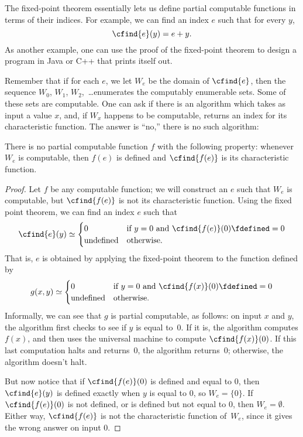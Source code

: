 \documentclass[../../../include/open-logic-section]{subfiles}
\begin{document}

The fixed-point theorem essentially lets us define partial computable
functions in terms of their indices. For example, we can find an
index $e$ such that for every $y$,
\[
\cfind{e}(y) = e + y.
\]
As another example, one can use the proof of the fixed-point theorem
to design a program in Java or C++ that prints itself out.

Remember that if for each $e$, we let $W_e$ be the domain of $\cfind{e}$,
then the sequence $W_0$, $W_1$, $W_2$,~\dots enumerates the computably
enumerable sets. Some of these sets are computable. One can ask if
there is an algorithm which takes as input a value $x$, and, if $W_x$
happens to be computable, returns an index for its characteristic
function. The answer is ``no,'' there is no such algorithm:

\begin{thm}
There is no partial computable function $f$ with the following
property: whenever $W_e$ is computable, then $f(e)$ is defined and
$\cfind{f(e)}$ is its characteristic function.
\end{thm}

\begin{proof}
Let $f$ be any computable function; we will construct an $e$
such that $W_e$ is computable, but $\cfind{f(e)}$ is not its
characteristic function. Using the fixed point theorem, we can find an
index $e$ such that
\[
\cfind{e}(y) \simeq
\begin{cases}
0 & \text{if $y=0$ and $\cfind{f(e)}(0) \fdefined = 0$} \\
\text{undefined} & \text{otherwise.}
\end{cases}
\]
That is, $e$ is obtained by applying the fixed-point theorem to the
function defined by
\[
g(x,y) \simeq
\begin{cases}
0 & \text{if $y=0$ and $\cfind{f(x)}(0) \fdefined = 0$} \\
\text{undefined} & \text{otherwise.}
\end{cases}
\]
Informally, we can see that $g$ is partial computable, as follows: on
input $x$ and $y$, the algorithm first checks to see if $y$ is equal
to~$0$. If it is, the algorithm computes $f(x)$, and then uses the
universal machine to compute $\cfind{f(x)}(0)$. If this last computation
halts and returns~$0$, the algorithm returns~$0$; otherwise, the
algorithm doesn't halt.

But now notice that if $\cfind{f(e)}(0)$ is defined and equal to $0$,
then $\cfind{e}(y)$ is defined exactly when $y$ is equal to $0$, so $W_e =
\{ 0 \}$. If $\cfind{f(e)}(0)$ is not defined, or is defined but not
equal to $0$, then $W_e = \emptyset$. Either way, $\cfind{f(e)}$ is not
the characteristic function of~$W_e$, since it gives the wrong answer
on input $0$.
\end{proof}
\end{document}
